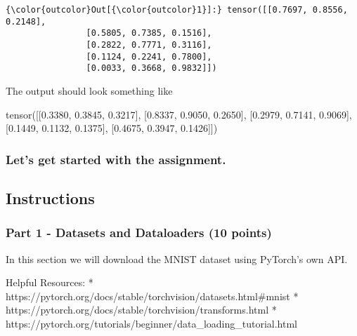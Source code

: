 \documentclass[11pt]{article}
\newenvironment{Shaded}{}{}
\newcommand{\FloatTok}[1]{\textcolor[rgb]{0.25,0.63,0.44}{{#1}}}
\newcommand{\NormalTok}[1]{{#1}}
\begin{document}
\begin{Verbatim}[commandchars=\\\{\}]
{\color{outcolor}Out[{\color{outcolor}1}]:} tensor([[0.7697, 0.8556, 0.2148],
                [0.5805, 0.7385, 0.1516],
                [0.2822, 0.7771, 0.3116],
                [0.1124, 0.2241, 0.7800],
                [0.0033, 0.3668, 0.9832]])
\end{Verbatim}
            
    The output should look something like

\begin{Shaded}
\begin{Highlighting}[]
\NormalTok{tensor([[}\FloatTok{0.3380}\NormalTok{, }\FloatTok{0.3845}\NormalTok{, }\FloatTok{0.3217}\NormalTok{],}
\NormalTok{        [}\FloatTok{0.8337}\NormalTok{, }\FloatTok{0.9050}\NormalTok{, }\FloatTok{0.2650}\NormalTok{],}
\NormalTok{        [}\FloatTok{0.2979}\NormalTok{, }\FloatTok{0.7141}\NormalTok{, }\FloatTok{0.9069}\NormalTok{],}
\NormalTok{        [}\FloatTok{0.1449}\NormalTok{, }\FloatTok{0.1132}\NormalTok{, }\FloatTok{0.1375}\NormalTok{],}
\NormalTok{        [}\FloatTok{0.4675}\NormalTok{, }\FloatTok{0.3947}\NormalTok{, }\FloatTok{0.1426}\NormalTok{]])}
\end{Highlighting}
\end{Shaded}

\hypertarget{lets-get-started-with-the-assignment.}{%
\subsubsection{Let's get started with the
assignment.}\label{lets-get-started-with-the-assignment.}}

    \hypertarget{instructions}{%
\subsection{Instructions}\label{instructions}}

\hypertarget{part-1---datasets-and-dataloaders-10-points}{%
\subsubsection{Part 1 - Datasets and Dataloaders (10
points)}\label{part-1---datasets-and-dataloaders-10-points}}

In this section we will download the MNIST dataset using PyTorch's own
API.

Helpful Resources: *
https://pytorch.org/docs/stable/torchvision/datasets.html\#mnist *
https://pytorch.org/docs/stable/torchvision/transforms.html *
https://pytorch.org/tutorials/beginner/data\_loading\_tutorial.html
\end{document}
